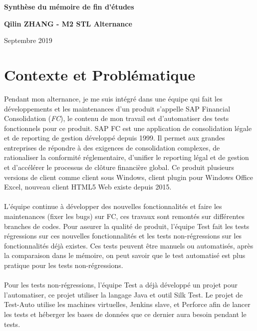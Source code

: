 \documentclass[french]{article}
\begin{document}
	\begin{center}
		\textbf{\LARGE{Synthèse du mémoire de fin d'études}}
	\end{center}
	
	\begin{center}
		\textbf{\Large{Qilin ZHANG - M2 STL Alternance}}
	\end{center}

	\begin{flushright}
		\large {Septembre 2019}
	\end{flushright}

	\section{Contexte et Problématique}
	Pendant mon alternance, je me suis intégré dans une équipe qui fait les développements et les maintenances d'un produit s'appelle SAP Financial Consolidation (\textit{FC}), le contenu de mon travail est d'automatiser des tests fonctionnels pour ce produit. SAP FC est une application de consolidation légale et de 	reporting de gestion développé depuis 1999. Il permet aux grandes entreprises de répondre à des exigences de consolidation complexes, de rationaliser la conformité réglementaire, d’unifier le reporting légal et de gestion et d’accélérer le processus de clôture financière global. Ce produit plusieurs versions de client comme client sous Windows, client plugin pour Windows Office Excel, nouveau client HTML5 Web existe depuis 2015. 
	\paragraph*{}
	L'équipe continue à développer des nouvelles fonctionnalités et faire les maintenances (fixer les bugs) sur FC, ces travaux sont remontés sur différentes branches de codes. Pour assurer la qualité de produit, l'équipe Test fait les tests régressions sur ces nouvelles fonctionnalités et les tests non-régressions sur les fonctionnalités déjà existes. Ces tests peuvent être manuels ou automatisés, après la comparaison dans le mémoire, on peut savoir que le test automatisé est plus pratique pour les tests non-régressions.
	
	\paragraph*{}
	Pour les tests non-régressions, l'équipe Test a déjà développé un projet pour l'automatiser, ce projet utiliser la langage Java et outil Silk Test. Le projet de Test-Auto utilise les machines virtuelles, Jenkins slave, et Perforce afin de lancer les tests et héberger les bases de données que ce dernier aura besoin pendant le tests.
	
\end{document}
